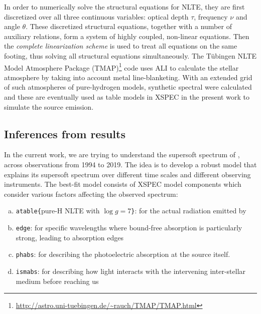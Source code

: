 		In order to numerically solve the structural equations for NLTE, they are first discretized over all three continuous variables: optical depth $\tau$, frequency $\nu$ and angle $\theta$. These discretized structural equations, together with a number of auxiliary relations, form a system of highly coupled, non-linear equations. Then the \textit{complete linearization scheme} \cite{auer1970non} is used to treat all equations on the same footing, thus solving all structural equations simultaneously. The T\"{u}bingen NLTE Model Atmosphere Package (TMAP)\footnote{\url{http://astro.uni-tuebingen.de/~rauch/TMAP/TMAP.html}} code uses ALI to calculate the stellar atmosphere by taking into account metal line-blanketing. With an extended grid of such atmospheres of pure-hydrogen models, synthetic spectral were calculated and these are eventually used as table models in XSPEC in the present work to simulate the source emission.
    
    \subsection{Inferences from results}
    In the current work, we are trying to understand the supersoft spectrum of \source, across observations from 1994 to 2019. The idea is to develop a robust model that explains its supersoft spectrum over different time scales and different observing instruments. The best-fit model consists of XSPEC model components which consider various factors affecting the observed spectrum:
    \begin{enumerate}[a)]
   		\item \texttt{atable\{}pure-H NLTE with $\log{g}=7$\texttt{\}}: for the actual radiation emitted by \source
   		\item \texttt{edge}: for specific wavelengths where bound-free absorption is particularly strong, leading to absorption edges
   		\item \texttt{phabs}: for describing the photoelectric absorption at the source itself.
   		\item \texttt{ismabs}: for describing how light interacts with the intervening inter-stellar medium before reaching us
   	\end{enumerate}
    	
